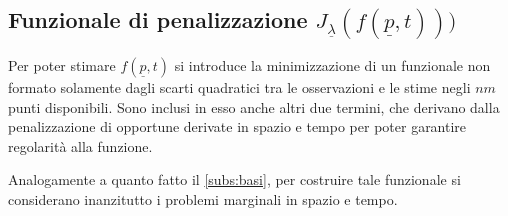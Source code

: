 \documentclass[a4paper,11pt,twoside,openright]{book}							%
\begin{document}
\subsection{Funzionale di penalizzazione $J_{\underline \lambda }(f(\underline p,t)))$}

Per poter stimare $f(\underline p,t)$ si introduce la minimizzazione di un funzionale non formato solamente dagli scarti quadratici tra le osservazioni e le stime negli $nm$ punti disponibili. Sono inclusi in esso anche altri due termini, che derivano dalla penalizzazione di opportune derivate in spazio e tempo per poter garantire regolarità alla funzione.

Analogamente a quanto fatto il \ref{subs:basi}, per costruire tale funzionale si considerano inanzitutto i problemi marginali in spazio e tempo.
\end{document}
